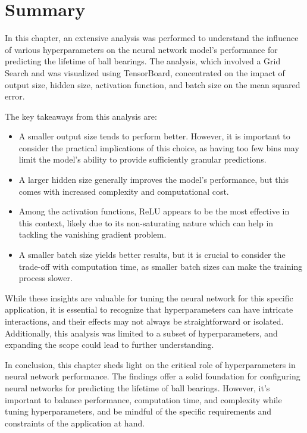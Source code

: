 \section{Summary}

In this chapter, an extensive analysis was performed to understand the influence of various hyperparameters on the neural network model's performance for predicting the lifetime of ball bearings. The analysis, which involved a Grid Search and was visualized using TensorBoard, concentrated on the impact of output size, hidden size, activation function, and batch size on the mean squared error.

The key takeaways from this analysis are:

\begin{itemize}
    \item A smaller output size tends to perform better. However, it is important to consider the practical implications of this choice, as having too few bins may limit the model's ability to provide sufficiently granular predictions.
    
    \item A larger hidden size generally improves the model's performance, but this comes with increased complexity and computational cost.
    
    \item Among the activation functions, ReLU appears to be the most effective in this context, likely due to its non-saturating nature which can help in tackling the vanishing gradient problem.
    
    \item A smaller batch size yields better results, but it is crucial to consider the trade-off with computation time, as smaller batch sizes can make the training process slower.
\end{itemize}

While these insights are valuable for tuning the neural network for this specific application, it is essential to recognize that hyperparameters can have intricate interactions, and their effects may not always be straightforward or isolated. Additionally, this analysis was limited to a subset of hyperparameters, and expanding the scope could lead to further understanding.

In conclusion, this chapter sheds light on the critical role of hyperparameters in neural network performance. The findings offer a solid foundation for configuring neural networks for predicting the lifetime of ball bearings. However, it's important to balance performance, computation time, and complexity while tuning hyperparameters, and be mindful of the specific requirements and constraints of the application at hand.

